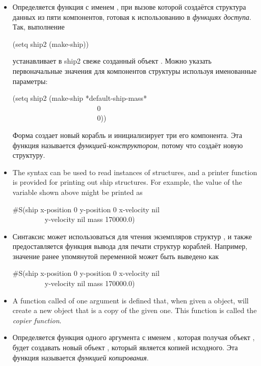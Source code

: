 \begin{itemize}
\item 
Определяется функция с именем , при вызове которой создаётся
структура данных из пяти компонентов, готовая к использованию в \emph{функциях
  доступа}.
Так, выполнение
\begin{lisp}
(setq ship2 (make-ship))
\end{lisp}
устанавливает в ship2 свеже созданный объект .
Можно указать первоначальные значения для компонентов структуры используя
именованные параметры:
\begin{lisp}
(setq ship2 (make-ship  *default-ship-mass* \\
~~~~~~~~~~~~~~~~~~~~~~~ 0 \\
~~~~~~~~~~~~~~~~~~~~~~~ 0))
\end{lisp}
Форма создает новый корабль и инициализирует три его компонента.
Эта функция называется \emph{функцией-конструктором}, потому что создаёт новую
структуру.

\item
The  syntax can be used to read instances of 
structures, and a printer function is provided for printing
out ship structures.  For example, the value of the
variable  shown above might be printed as
\begin{lisp}
\#S(ship  x-position 0  y-position 0  x-velocity nil \\
~~~~~~~~~y-velocity nil  mass 170000.0)
\end{lisp}

\item
Синтаксис  может использоваться для чтения экземпляров структур
, и также предоставляется функция вывода для печати структур кораблей.
Например, значение ранее упомянутой переменной  может быть выведено
как
\begin{lisp}
\#S(ship  x-position 0  y-position 0  x-velocity nil \\
~~~~~~~~~y-velocity nil  mass 170000.0)
\end{lisp}

\item
A function called  of one argument
is defined that, when given a  object,
will create a new  object that is a copy of the given one.
This function is called the \emph{copier function}.

\item 
Определяется функция одного аргумента с именем , которая получая
объект , будет создавать новый объект , который является
копией исходного.
Эта функция называется \emph{функцией копирования}.


\end{itemize}
